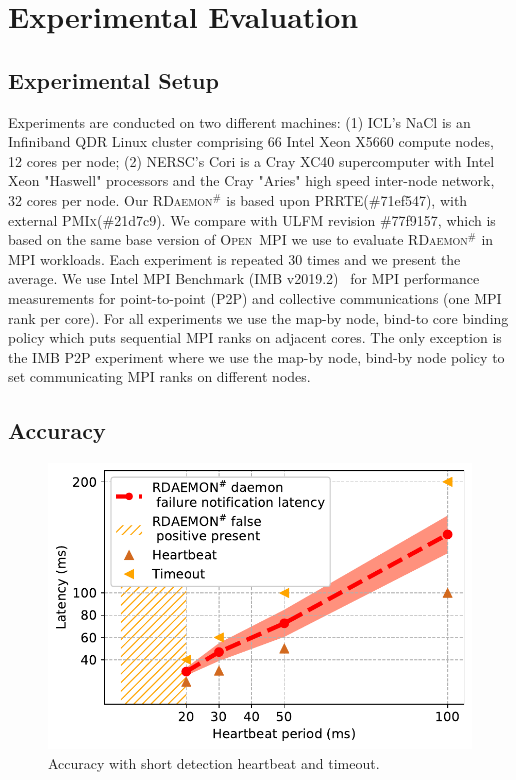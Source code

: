 \documentclass[5p,times,twocolumn]{elsarticle}
\newcommand{\prrte}[0]{\textsc{PRRTE}\xspace}
\newcommand{\pmix}[0]{\textsc{PMIx}\xspace}
\newcommand{\ompi}[0]{\textsc{Open~MPI}\xspace}
\newcommand{\ulfm}[0]{\textsc{ULFM}\xspace}
\newcommand{\mpi}[0]{\textsc{MPI}\xspace}
\newcommand{\ourwork}[0]{\textsc{RDaemon}\ensuremath{^\#}\xspace}
\newcommand{\imb}[0]{\textsc{IMB}\xspace}
\begin{document}
\section{Experimental Evaluation}\label{sec:experiments}

\subsection{Experimental Setup}
Experiments are conducted on two different machines: (1) ICL's NaCl is an Infiniband QDR Linux cluster comprising 66 Intel Xeon X5660 compute nodes, 12 cores per node; (2) NERSC's Cori
is a Cray XC40 supercomputer with Intel Xeon "Haswell" processors and the Cray "Aries" high speed inter-node network, 32 cores per node. Our \ourwork is based upon \prrte (\#71ef547), with external \pmix (\#21d7c9). We compare with \ulfm revision \#77f9157, which is based on the same base version of \ompi we use to evaluate \ourwork in \mpi workloads. Each experiment is repeated 30 times and we present the average. We use Intel \mpi Benchmark (\imb v2019.2)~\cite{IMB} for \mpi performance measurements for point-to-point (P2P) and collective communications (one \mpi rank per core). For all experiments we use the map-by node, bind-to core binding policy which puts sequential \mpi ranks on adjacent cores. The only exception is the \imb P2P experiment where we use
the map-by node, bind-by node policy to set communicating \mpi ranks on different nodes.

\subsection{Accuracy}
\begin{figure}[h]
  \centering
  \includegraphics[width=\linewidth]{accuracy.pdf}\vspace{-1em}
  \caption{Accuracy with short detection heartbeat and timeout.}
  \label{fig:accuracy}
\end{figure}
\end{document}
